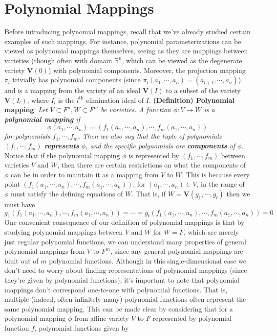 \documentclass{article}
\newcommand*{\tb}{\textbf}
\newcommand*{\ti}{\textit}
\newcommand*{\n}{\newline}
\newcommand*{\nn}{\newline \newline}
\newcommand*{\gt}{g_1, \cdots, g_t}
\newcommand*{\V}{\ensuremath{\mathbf{V}}}
\newcommand*{\VI}{\ensuremath{\mathbf{V}(I)}}
\begin{document}
\section{Polynomial Mappings}
Before introducing polynomial mappings, recall that we've already studied certain examples of such mappings. For instance, polynomial parameterizations can be viewed as polynomial mappings themselves, seeing as they are mappings between varieties (though often with domain $ \mathbb{R}^n $, which can be viewed as the degenerate variety $ \V(0) $) with polynomial components. Moreover, the projection mapping $ \pi_l $ trivially has polynomial components (since $ \pi_l(a_1, \cdots, a_n) = (a_{l + 1}, \cdots, a_n) $) and is a mapping from the variety of an ideal $ \VI $ to a subset of the variety $ \V(I_l) $, where $ I_l $ is the $ l^{\text{th}} $ elimination ideal of $ I $.
\nn
\tb{(Definition) Polynomial mapping}: \ti{Let $ V \subset F^n, W \subset F^m $ be varieties. A function $ \phi: V \rightarrow W $ is a \tb{polynomial mapping} if}
$$ \phi(a_1, \cdots, a_n) = (f_1(a_1, \cdots, a_n), \cdots, f_m(a_1, \cdots, a_n)) $$
\indent \ti{for polynomials $ f_1, \cdots, f_m $. Then we also say that the tuple of polynomials $ (f_1, \cdots, f_m) $ \tb{represents} $ \phi $, and the specific polynomials are \tb{components} of $ \phi $.}
\nn
Notice that if the polynomial mapping $ \phi $ is represented by $ (f_1, \cdots, f_m) $ between varieties $ V $ and $ W $, then there are certain restrictions on what the components of $ \phi $ can be in order to maintain it as a mapping from $ V $ to $ W $. This is because every point $ (f_1(a_1, \cdots, a_n), \cdots, f_m(a_1, \cdots, a_n)) $, for $ (a_1, \cdots, a_n) \in V $, in the range of $ \phi $ must satisfy the defining equations of $ W $. That is, if $ W = \V(\gt) $ then we must have
$$ g_1(f_1(a_1, \cdots, a_n), \cdots, f_m(a_1, \cdots, a_n)) = \cdots = g_t(f_1(a_1, \cdots, a_n), \cdots, f_m(a_1, \cdots, a_n)) = 0 $$
One convenient consequence of our definition of polynomial mappings is that by studying polynomial mappings between $ V $ and $ W $ for $ W = F $, which are merely just regular polynomial functions, we can understand many properties of general polynomial mappings from $ V $ to $ F^m $, since any general polynomial mappings are biult out of $ m $ polynomial functions.
\n
Although in this single-dimensional case we don't need to worry about finding representations of polynomial mappings (since they're given by polynomial functions), it's important to note that polynomial mappings don't correspond one-to-one with polynomial functions. That is, multiple (indeed, often infinitely many) polynomial functions often represent the same polynomial mapping. This can be made clear by considering that for a polynomial mapping $ \phi $ from affine variety $ V $ to $ F $ represented by polynomial function $ f $, polynomial functions given by
\end{document}
